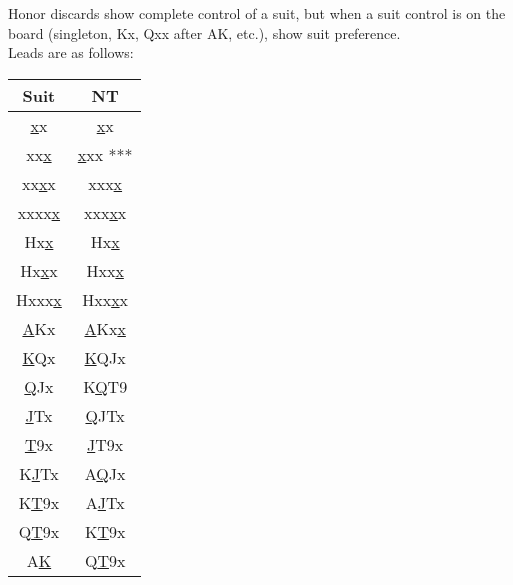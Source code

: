 \documentclass[12pt]{report}
\newcommand{\n}{\\}
\begin{document}
    Honor discards show complete control of a suit, but when a suit control is on the board (singleton, Kx, Qxx after AK, etc.), show suit preference.\n

    \newcommand{\uu}[1]{\underline{#1}}
    Leads are as follows:
    \begin{center}
        \begin{tabular}{ |c|c| } 
            \hline
            Suit & NT \n
            \hline
            \uu{x}x & \uu{x}x\n
            xx\uu{x} & \uu{x}xx ***\n
            xx\uu{x}x & xxx\uu{x}\n
            xxxx\uu{x} & xxx\uu{x}x\n
            Hx\uu{x} & Hx\uu{x}\n
            Hx\uu{x}x & Hxx\uu{x}\n
            Hxxx\uu{x} & Hxx\uu{x}x\n
            \uu{A}Kx & \uu{A}Kx\uu{x}\n
            \uu{K}Qx & \uu{K}QJx\n
            \uu{Q}Jx & K\uu{Q}T9\n
            \uu{J}Tx & \uu{Q}JTx\n
            \uu{T}9x & \uu{J}T9x\n
            K\uu{J}Tx & A\uu{Q}Jx\n
            K\uu{T}9x & A\uu{J}Tx\n
            Q\uu{T}9x & K\uu{T}9x\n
            A\uu{K} & Q\uu{T}9x\n
            \hline
        \end{tabular}
    \end{center}
\end{document}
